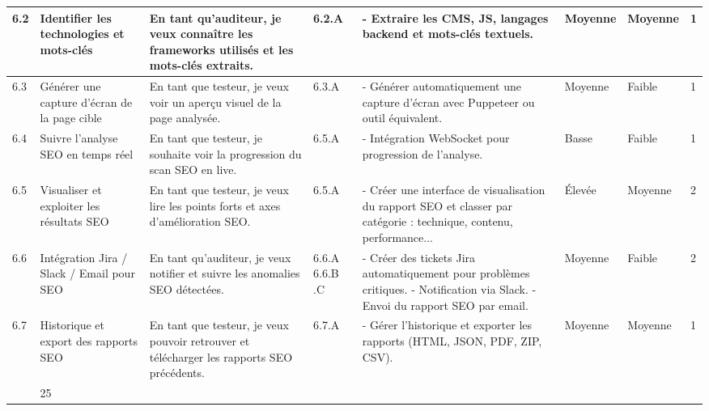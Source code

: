 \begin{landscape}
\begin{spacing}{0.98}
\begin{longtable}{|p{0.5cm}|p{3cm}|p{6cm}|p{0.9cm}|p{7.8cm}|p{0.6cm}|p{0.6cm}|p{1.2cm}|}
                6.2 & Identifier les technologies et mots-clés
                    & En tant qu'auditeur, je veux connaître les frameworks utilisés et les mots-clés extraits.
                    & 6.2.A 
                    & - Extraire les CMS, JS, langages backend et mots-clés textuels.
                    & Moyenne & Moyenne & 1 \\\hline
                
                6.3 & Générer une capture d'écran de la page cible
                    & En tant que testeur, je veux voir un aperçu visuel de la page analysée.
                    & 6.3.A 
                    & - Générer automatiquement une capture d'écran avec Puppeteer ou outil équivalent.
                    & Moyenne & Faible & 1 \\\hline
                
                6.4 & Suivre l'analyse SEO en temps réel
                    & En tant que testeur, je souhaite voir la progression du scan SEO en live.
                    & 6.5.A 
                    & - Intégration WebSocket pour progression de l'analyse.
                    & Basse & Faible & 1 \\\hline
                
                6.5 & Visualiser et exploiter les résultats SEO
                    & En tant que testeur, je veux lire les points forts et axes d'amélioration SEO.
                    & 6.5.A 
                    & - Créer une interface de visualisation du rapport SEO et classer par catégorie : technique, contenu, performance...
                    & Élevée & Moyenne & 2 \\\hline
                
                6.6 & Intégration Jira / Slack / Email pour SEO
                    & En tant qu'auditeur, je veux notifier et suivre les anomalies SEO détectées.
                    & 6.6.A \newline\vspace{0.5cm} 6.6.B \newline 6.6.C
                    & - Créer des tickets Jira automatiquement pour problèmes critiques. \newline
                      - Notification via Slack. \newline
                      - Envoi du rapport SEO par email.
                    & Moyenne & Faible & 2 \\\hline
                6.7 & Historique et export des rapports SEO
                    & En tant que testeur, je veux pouvoir retrouver et télécharger les rapports SEO précédents.
                    & 6.7.A 
                    & - Gérer l'historique et exporter les rapports (HTML, JSON, PDF, ZIP, CSV).
                    & Moyenne & Moyenne & 1 \\\hline          
            \rowcolor{gray!20}
			\multicolumn{7}{|c|}{TOTAL} &  25 \\
            \hline 
        \end{longtable}
    \end{spacing}
\end{landscape}